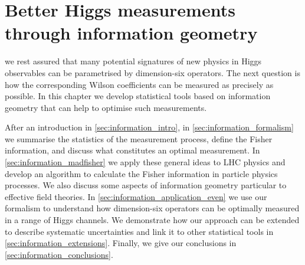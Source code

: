  






\chapter{Better Higgs measurements through information geometry}
\label{chapter:information}

 we rest assured
that many potential signatures of new physics in Higgs observables can
be parametrised by dimension-six operators. The next question is how
the corresponding Wilson coefficients can be measured as precisely as
possible. In this chapter we develop statistical tools based on
information geometry that can help to optimise such measurements.

After an introduction in \autoref{sec:information_intro}, in
\autoref{sec:information_formalism} we summarise the statistics of the
measurement process, define the Fisher information, and discuss what
constitutes an optimal measurement. In
\autoref{sec:information_madfisher} we apply these general ideas to
LHC physics and develop an algorithm to calculate the Fisher
information in particle physics processes. We also discuss some
aspects of information geometry particular to effective field
theories. In \autoref{sec:information_application_even} we use our
formalism to understand how dimension-six operators can be optimally
measured in a range of Higgs channels.
We demonstrate how our approach can be extended to describe systematic
uncertainties and link it to other statistical tools in
\autoref{sec:information_extensions}. Finally, we give our conclusions
in \autoref{sec:information_conclusions}.

